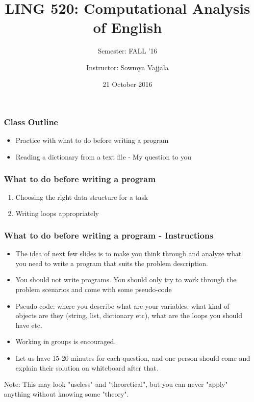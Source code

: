 \documentclass{beamer}
\author[Sowmya Vajjala]{Instructor: Sowmya Vajjala}
\title[LING 520]{LING 520: Computational Analysis of English}
\subtitle{Semester: FALL '16}
\date{21 October 2016}
\institute{Iowa State University, USA}
\begin{document}
\begin{frame}\titlepage
\end{frame}

\begin{frame}
\frametitle{Class Outline}
\begin{itemize}
\item Practice with what to do before writing a program
\item Reading a dictionary from a text file - My question to you
\end{itemize}
\end{frame}

\begin{frame}
\frametitle{What to do before writing a program}
\begin{enumerate}
\item Choosing the right data structure for a task
\item Writing loops appropriately
\end{enumerate}
\end{frame} %

\begin{frame}
\frametitle{What to do before writing a program - Instructions}
\begin{itemize}
\item The idea of next few slides is to make you think through and analyze what you need to write a program that suits the problem description.
\item You should not write programs. You should only try to work through the problem scenarios and come with some pseudo-code
\item Pseudo-code: where you describe what are your variables, what kind of objects are they (string, list, dictionary etc), what are the loops you should have etc.
\item Working in groups is encouraged. 
\item Let us have 15-20 minutes for each question, and one person should come and explain their solution on whiteboard after that.
\end{itemize}
\pause Note: This may look "useless" and "theoretical", but you can never "apply" anything without knowing some "theory". 
\end{frame}
\end{document}
